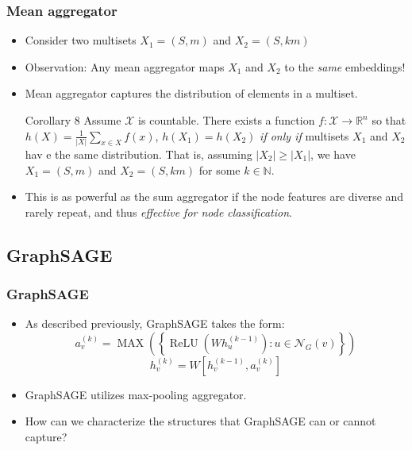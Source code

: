 \documentclass{beamer}
\DeclareMathOperator{\MAX}{MAX}
\DeclareMathOperator{\relu}{ReLU}
\begin{document}
\begin{frame}
\frametitle{Mean aggregator}

\begin{itemize}
	\item Consider two multisets $X_1 = (S, m)$ and $X_2 = (S, k m)$ \pause
	
	\item Observation: Any mean aggregator maps $X_1$ and $X_2$ to the {\it same} embeddings! \pause
	
	\item Mean aggregator captures the \alert{distribution of elements in a multiset}. \pause

\begin{block}{Corollary 8}
Assume $\mathcal{X}$ is countable.
There exists a function $f : \mathcal{X} \rightarrow \mathbb{R}^n$ so that $h(X) = \frac{1}{|X|}\sum_{x \in X} f(x)$, $h(X_1) = h(X_2)$ {\it if only if} multisets $X_1$ and $X_2$ hav e the same distribution.
That is, assuming $|X_2| \geq |X_1|$, we have $X_1 = (S, m)$ and $X_2 = (S, k m)$ for some $k \in \mathbb{N}$.

\end{block} \pause

	\item This is as powerful as the sum aggregator if the node features are diverse and rarely repeat, and thus {\it effective for node classification}.

\end{itemize}
\end{frame}



\subsection{GraphSAGE}

\begin{frame}
\frametitle{GraphSAGE}

\begin{itemize}
	\item As described previously, GraphSAGE takes the form:
	$$a_v^{(k)} = \MAX \left( \left\{ \relu \left( W h_u^{(k - 1)} \right) : u \in \mathcal{N}_G(v) \right\} \right)$$
	$$h_v^{(k)} = W \left[ h_v^{(k - 1)}, a_v^{(k)} \right]$$ \pause
	
	\item GraphSAGE utilizes max-pooling aggregator. \pause
	
	\item How can we characterize the structures that GraphSAGE can or cannot capture?
\end{itemize}

\end{frame}
\end{document}
